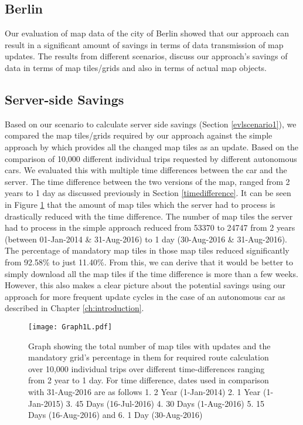 \subsection{Berlin}


Our evaluation of map data of the city of Berlin showed that our approach can result in a significant amount of savings in terms of data transmission of map updates. The results from different scenarios, discuss our approach's savings of data in terms of map tiles/grids and also in terms of actual map objects. 





\subsection{Server-side Savings}
Based on our scenario to calculate server side savings (Section \ref{evlscenario1}), we compared the map tiles/grids required by our approach against the simple approach by \citet{bastiaensen2003actmap} which provides all the changed map tiles as an update. Based on the comparison of 10,000 different individual trips requested by different autonomous cars. We evaluated this with multiple time differences between the car and the server. 
The time difference between the two versions of the map, ranged from 2 years to 1 day as discussed previously in Section \ref{timedifference}. 
It can be seen in Figure \ref{fg:scenario1} that the amount of map tiles which the server had to process is drastically reduced with the time difference. The number of map tiles the server had to process in the simple approach reduced from 53370 to 24747 from 2 years (between 01-Jan-2014 \& 31-Aug-2016) to 1 day (30-Aug-2016 \& 31-Aug-2016). The percentage of mandatory map tiles in those map tiles reduced significantly from 92.58\% to just 11.40\%. From this, we can derive that it would be better to simply download all the map tiles if the time difference is more than a few weeks. However, this also makes a clear picture about the potential savings using our approach for more frequent update cycles in the case of an autonomous car as described in Chapter \ref{ch:introduction}. \\

\begin{figure}
\centering
\texttt{[image: Graph1L.pdf]}
\caption{Graph showing the total number of map tiles with updates and the mandatory grid's percentage in them for required route calculation over 10,000 individual trips over different time-differences ranging from 2 year to 1 day. For time difference, dates used in comparison with 31-Aug-2016 are as follows 1. 2 Year (1-Jan-2014) 2. 1 Year (1-Jan-2015) 3. 45 Days (16-Jul-2016) 4. 30 Days (1-Aug-2016) 5. 15 Days (16-Aug-2016) and 6. 1 Day (30-Aug-2016)}
\label{fg:scenario1}
\end{figure}


